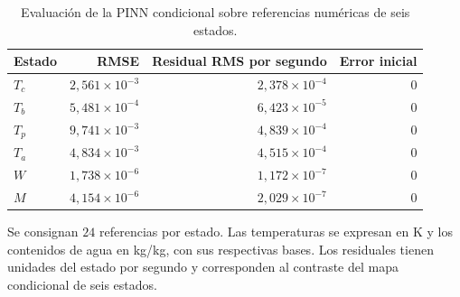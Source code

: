 \begin{table}[htbp]
\centering
\caption{Evaluación de la PINN condicional sobre referencias numéricas de seis estados.}
\label{tab:res_pinn}
\small
\setlength{\tabcolsep}{5pt}
\begin{tabular}{lrrr}
\toprule
Estado & RMSE & Residual RMS por segundo & Error inicial \\
\midrule
$T_c$ & $2{,}561\times10^{-3}$ & $2{,}378\times10^{-4}$ & $0$ \\
$T_b$ & $5{,}481\times10^{-4}$ & $6{,}423\times10^{-5}$ & $0$ \\
$T_p$ & $9{,}741\times10^{-3}$ & $4{,}839\times10^{-4}$ & $0$ \\
$T_a$ & $4{,}834\times10^{-3}$ & $4{,}515\times10^{-4}$ & $0$ \\
$W$ & $1{,}738\times10^{-6}$ & $1{,}172\times10^{-7}$ & $0$ \\
$M$ & $4{,}154\times10^{-6}$ & $2{,}029\times10^{-7}$ & $0$ \\
\bottomrule
\end{tabular}
\par\vspace{3pt}
\begin{minipage}{0.98\textwidth}\footnotesize
Se consignan $24$ referencias por estado. Las temperaturas se expresan en K y los contenidos de agua en kg/kg, con sus respectivas bases. Los residuales tienen unidades del estado por segundo y corresponden al contraste del mapa condicional de seis estados.
\end{minipage}
\end{table}
